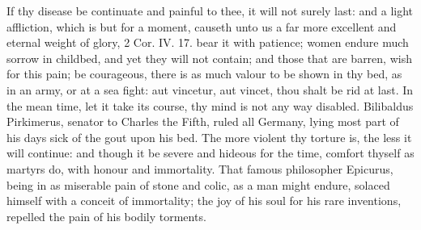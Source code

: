 {If thy disease be continuate and painful to thee, it will not surely
last: and a light affliction, which is but for a moment, causeth unto
us a far more excellent and eternal weight of glory, 2 Cor. IV. 17.
bear it with patience; women endure much sorrow in childbed, and yet
they will not contain; and those that are barren, wish for this pain;
be courageous, there is as much valour to be shown in thy bed, as
in an army, or at a sea fight: aut vincetur, aut vincet, thou shalt be
rid at last. In the mean time, let it take its course, thy mind is not
any way disabled. Bilibaldus Pirkimerus, senator to Charles the Fifth,
ruled all Germany, lying most part of his days sick of the gout upon
his bed. The more violent thy torture is, the less it will continue:
and though it be severe and hideous for the time, comfort thyself as
martyrs do, with honour and immortality. That famous philosopher
Epicurus, being in as miserable pain of stone and colic, as a man might
endure, solaced himself with a conceit of immortality; the joy of his
soul for his rare inventions, repelled the pain of his bodily torments.

}
